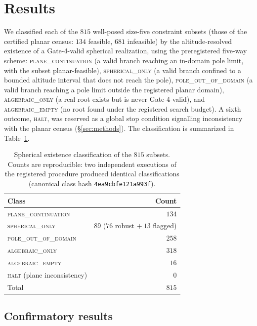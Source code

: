 \documentclass[11pt]{article}
\begin{document}
\section{Results}
\label{sec:results}

We classified each of the $815$ well-posed size-five constraint subsets
(those of the certified planar census: $134$ feasible, $681$ infeasible) by
the altitude-resolved existence of a Gate-4-valid spherical realization, using the preregistered five-way scheme: \textsc{plane\_continuation} (a valid branch reaching an in-domain pole limit, with the subset planar-feasible), \textsc{spherical\_only} (a valid branch confined to a bounded altitude interval that does not reach the pole), \textsc{pole\_out\_of\_domain} (a valid branch reaching a pole limit outside the registered planar domain), \textsc{algebraic\_only} (a real root exists but is never Gate-4-valid), and \textsc{algebraic\_empty} (no root found under the registered search budget). A sixth outcome, \textsc{halt}, was reserved as a global stop condition signalling inconsistency with the planar census (\S\ref{sec:methods}). The classification is
summarized in Table~\ref{tab:census}.

\begin{table}[htpb]
\centering
\caption{Spherical existence classification of the $815$ subsets. Counts are
reproducible: two independent executions of the registered procedure produced
identical classifications (canonical class hash \texttt{4ea9cbfe121a993f}).}
\label{tab:census}
\begin{tabular}{lr}
\hline
Class & Count \\
\hline
\textsc{plane\_continuation} & $134$ \\
\textsc{spherical\_only} & $89$ ($76$ robust $+\ 13$ flagged) \\
\textsc{pole\_out\_of\_domain} & $258$ \\
\textsc{algebraic\_only} & $318$ \\
\textsc{algebraic\_empty} & $16$ \\
\textsc{halt} (plane inconsistency) & $0$ \\
\hline
Total & $815$ \\
\hline
\end{tabular}
\end{table}

\subsection{Confirmatory results}
\label{sec:confirmatory}
\end{document}
